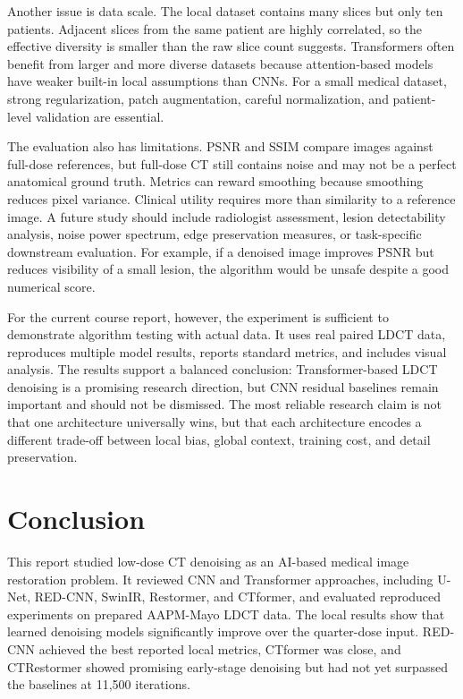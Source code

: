 \documentclass[journal]{IEEEtran}
\begin{document}
Another issue is data scale. The local dataset contains many slices but only ten patients. Adjacent slices from the same patient are highly correlated, so the effective diversity is smaller than the raw slice count suggests. Transformers often benefit from larger and more diverse datasets because attention-based models have weaker built-in local assumptions than CNNs. For a small medical dataset, strong regularization, patch augmentation, careful normalization, and patient-level validation are essential.

The evaluation also has limitations. PSNR and SSIM compare images against full-dose references, but full-dose CT still contains noise and may not be a perfect anatomical ground truth. Metrics can reward smoothing because smoothing reduces pixel variance. Clinical utility requires more than similarity to a reference image. A future study should include radiologist assessment, lesion detectability analysis, noise power spectrum, edge preservation measures, or task-specific downstream evaluation. For example, if a denoised image improves PSNR but reduces visibility of a small lesion, the algorithm would be unsafe despite a good numerical score.

For the current course report, however, the experiment is sufficient to demonstrate algorithm testing with actual data. It uses real paired LDCT data, reproduces multiple model results, reports standard metrics, and includes visual analysis. The results support a balanced conclusion: Transformer-based LDCT denoising is a promising research direction, but CNN residual baselines remain important and should not be dismissed. The most reliable research claim is not that one architecture universally wins, but that each architecture encodes a different trade-off between local bias, global context, training cost, and detail preservation.

\section{Conclusion}
This report studied low-dose CT denoising as an AI-based medical image restoration problem. It reviewed CNN and Transformer approaches, including U-Net, RED-CNN, SwinIR, Restormer, and CTformer, and evaluated reproduced experiments on prepared AAPM-Mayo LDCT data. The local results show that learned denoising models significantly improve over the quarter-dose input. RED-CNN achieved the best reported local metrics, CTformer was close, and CTRestormer showed promising early-stage denoising but had not yet surpassed the baselines at 11,500 iterations.
\end{document}
